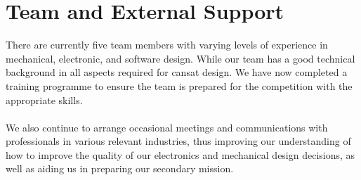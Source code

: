 \documentclass{report}
\begin{document}
	\section{Team and External Support}
		There are currently five team members with varying levels of experience in
		mechanical, electronic, and software design. While our team has a good
		technical background in all aspects required for cansat design. {\color{blue}
		We have now completed a training programme to ensure the team is 
		prepared for the competition with the appropriate skills.}
		\\\\
		We also continue to arrange occasional meetings and communications with
		professionals in various relevant industries, thus improving our 
		understanding of how to improve the quality of our electronics 
		and mechanical design decisions, as well as aiding us in preparing our
		secondary mission.
	\clearpage
\end{document}
